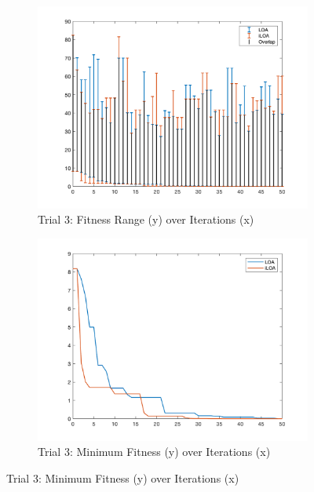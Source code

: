 \begin{figure}
  \begin{subfigure}[b]{0.4\textwidth}
    \includegraphics[width=\textwidth]{img/bars/f4/3}
    \caption{ \scriptsize Trial 3: Fitness Range (y) over Iterations (x)}
    \label{fig:f4-b-3}
  \end{subfigure}
  \begin{subfigure}[b]{0.4\textwidth}
    \includegraphics[width=\textwidth]{img/fits/f4/3}
    \caption{ \scriptsize Trial 3: Minimum Fitness (y) over Iterations (x)}
    \label{fig:f4-f-3}
  \end{subfigure}


\end{figure}
